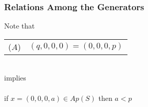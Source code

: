 \documentclass{beamer}
\begin{document}
\begin{frame}[noframenumbering]
\begin{center}
\frametitle{Relations Among the Generators}

Note that

{\footnotesize
\begin{center}
\begin{tabular}{cl}
($A$) & $\left(q, 0, 0, 0\right)=\left(0, 0, 0, p\right)$\\
\end{tabular}
\end{center}
}

~\\

implies\\

~\\

if $x = \left(0, 0, 0, a\right) \in Ap(S)$ then $a < p$

\end{center}
\end{frame}

\end{document}
